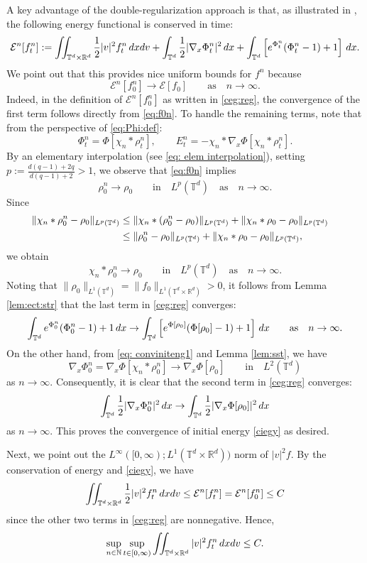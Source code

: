 \documentclass[11pt,reqno,a4paper]{amsart}
\newcommand{\N}{\mathbb{N}}
\newcommand{\R}{\mathbb{R}}
\newcommand{\intt}{\int_{\T^d}}
\theoremstyle{definition}
\theoremstyle{remark}
\numberwithin{equation}{section}
\newcommand{\T} {\mathbb T}
\newcommand{\lt}{\left}
\newcommand{\rt}{\right}
\newcommand{\bq}{\begin{equation}}
\newcommand{\eq}{\end{equation}}
\newcommand{\calE}{\mathcal E}
\newcommand{\dx}{\textnormal{d}x}
\newcommand{\dv}{\textnormal{d}v}
\begin{document}
A key advantage of the double-regularization approach is that, as illustrated in \cite{horst1990}, the following energy functional is conserved in time:
\bq\label{ceg:reg}
\calE^n[f_t^n]:=\iint_{\T^d\times\R^d} \frac{1}{2}|v|^2f_t^n\,\dx\dv + \intt \frac{1}{2} |\nabla_x \Phi_t^n|^2\,\dx + \intt \lt[ e^{\Phi_t^n}(\Phi_t^n-1)+1 \rt]\,\dx.
\eq
We point out that this provides nice uniform bounds for $f^n$ because
\bq\label{ciegy}
\calE^n[f_0^n] \to \calE[f_0]\qquad \mbox{as}\quad n \to \infty.
\eq
Indeed, in the definition of $\calE^n[f_0^n]$ as written in \eqref{ceg:reg}, the convergence of the first term follows directly from \eqref{eq:f0n}. To handle the remaining terms, note that from the perspective of \eqref{eq:Phi:def}:
\[
\Phi_t^n = \Phi[\chi_n*\rho_t^n], \qquad E_t^n = - \chi_n * \nabla_x \Phi[\chi_n*\rho_t^n].
\]
By an elementary interpolation (see \eqref{eq: elem interpolation}), setting $p:= \frac{d(q-1)+2q}{d(q-1) +2}>1$, we observe that \eqref{eq:f0n} implies
\[
\rho^n_0 \to \rho_0\qquad \mbox{in}\quad L^p(\T^d) \quad \mbox{as}\quad n \to \infty.
\]
Since
\begin{align*}
\|\chi_n * \rho_0^n - \rho_0\|_{L^p(\T^d)} &\le \|\chi_n * (\rho_0^n - \rho_0)\|_{L^p(\T^d)} + \|\chi_n * \rho_0 - \rho_0\|_{L^p(\T^d)}  \cr
&\le \|\rho_0^n - \rho_0\|_{L^p(\T^d)} + \|\chi_n * \rho_0 - \rho_0\|_{L^p(\T^d)},
\end{align*}
we obtain
\begin{equation}
\label{eq: conviniteng1}
\chi_n * \rho_0^n \to \rho_0\qquad \mbox{in}\quad L^p(\T^d) \quad \mbox{as}\quad n \to \infty.
\end{equation}
Noting that $\|\rho_0\|_{L^1(\T^d)} = \|f_0\|_{L^1(\T^d\times\R^d)} >0$, it follows from Lemma \ref{lem:ect:str} that the last term in \eqref{ceg:reg} converges:
\[
 \intt e^{\Phi_0^n}(\Phi_0^n-1)+1\,\dx \to \intt \lt[ e^{\Phi[\rho_0]}(\Phi[\rho_0]-1)+1 \rt] \,\dx\qquad \mbox{as} \quad n \to \infty.
\]
On the other hand, from \eqref{eq: conviniteng1} and Lemma \ref{lem:sst}, we have
\[
\nabla_x \Phi_0^n = \nabla_x \Phi[\chi_n*\rho_0^n] \to \nabla_x \Phi[\rho_0]\qquad \mbox{in}\quad L^2(\T^d)
\]
as $n\to \infty$. Consequently, it is clear that the second term in \eqref{ceg:reg} converges:
\[
\intt \frac{1}{2} |\nabla_x \Phi_0^n|^2\,\dx \to  \intt \frac{1}{2} |\nabla_x \Phi[\rho_0]|^2 \,\dx
\]
as $n\to \infty$. This proves the convergence of initial energy \eqref{ciegy} as desired.



Next, we point out the $L^\infty([0,\infty);L^1(\T^d\times\R^d))$ norm of $|v|^2f$. By the conservation of energy and \eqref{ciegy}, we have
\[
\iint_{\T^d\times\R^d} \frac{1}{2}|v|^2f_t^n\,\dx\dv \le \calE^n[f_t^n]=\calE^n[f_0^n] \le C
\]
since the other two terms in \eqref{ceg:reg} are nonnegative. Hence, 
\bq\label{eq:v2m:uni}
\sup_{n\in \N}\sup_{t\in[0,\infty)}\iint_{\T^d\times\R^d}|v|^2f_t^n \,\dx\dv \le C.
\eq
\end{document}
